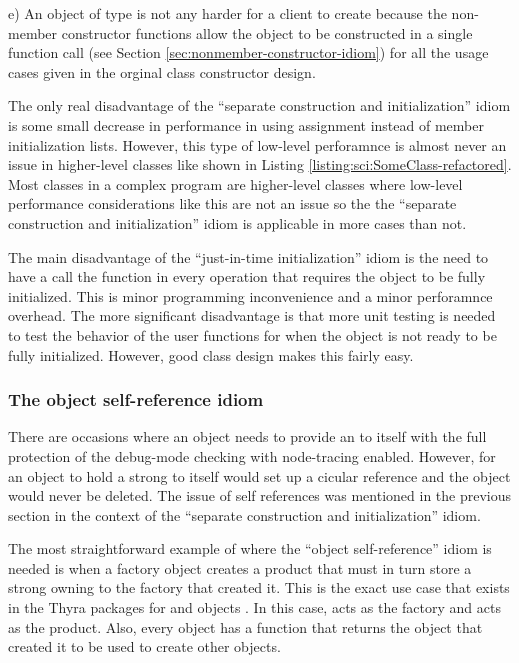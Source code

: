 \documentclass[pdf,ps2pdf,11pt]{SANDreport}
\begin{document}
e) An object of type {} is not any harder for a client to
create because the non-member constructor functions allow the object to be
constructed in a single function call (see Section
{}\ref{sec:nonmember-constructor-idiom}) for all the usage cases given in the
orginal class constructor design.

The only real disadvantage of the ``separate construction and initialization''
idiom is some small decrease in performance in using assignment instead of
member initialization lists.  However, this type of low-level perforamnce is
almost never an issue in higher-level classes like {} shown in
Listing {}\ref{listing:sci:SomeClass-refactored}.  Most classes in a complex
program are higher-level classes where low-level performance considerations
like this are not an issue so the the ``separate construction and
initialization'' idiom is applicable in more cases than not.

The main disadvantage of the ``just-in-time initialization'' idiom is the need
to have a call the function {} in every
operation that requires the object to be fully initialized.  This is minor
programming inconvenience and a minor perforamnce overhead.  The more
significant disadvantage is that more unit testing is needed to test the
behavior of the user functions for when the object is not ready to be fully
initialized.  However, good class design makes this fairly easy.


%
{}\subsubsection{The object self-reference idiom}
\label{sec:self-references}
%

There are occasions where an object needs to provide an {}
to itself with the full protection of the debug-mode checking with
node-tracing enabled.  However, for an object to hold a strong
{} to itself would set up a cicular reference and the
object would never be deleted.  The issue of self references was
mentioned in the previous section in the context of the ``separate
construction and initialization'' idiom.

The most straightforward example of where the ``object
self-reference'' idiom is needed is when a factory object creates a
product that must in turn store a strong owning {} to the
factory that created it.  This is the exact use case that exists in
the Thyra packages for {} and {}
objects {}\cite{ThyraOperatorVectorSAND}.  In this case,
{} acts as the factory and {}
acts as the product.  Also, every {} object has a
function {} that returns the {}
object that created it to be used to create other {}
objects.
\end{document}
